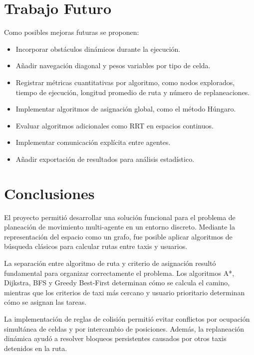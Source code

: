 \documentclass[12pt,a4paper]{article}
\begin{document}
\section{Trabajo Futuro}
\justifying

Como posibles mejoras futuras se proponen:

\begin{itemize}
    \item Incorporar obstáculos dinámicos durante la ejecución.
    \item Añadir navegación diagonal y pesos variables por tipo de celda.
    \item Registrar métricas cuantitativas por algoritmo, como nodos explorados, tiempo de ejecución, longitud promedio de ruta y número de replaneaciones.
    \item Implementar algoritmos de asignación global, como el método Húngaro.
    \item Evaluar algoritmos adicionales como RRT en espacios continuos.
    \item Implementar comunicación explícita entre agentes.
    \item Añadir exportación de resultados para análisis estadístico.
\end{itemize}

\section{Conclusiones}
\justifying

El proyecto permitió desarrollar una solución funcional para el problema de planeación de movimiento multi-agente en un entorno discreto. Mediante la representación del espacio como un grafo, fue posible aplicar algoritmos de búsqueda clásicos para calcular rutas entre taxis y usuarios.

La separación entre algoritmo de ruta y criterio de asignación resultó fundamental para organizar correctamente el problema. Los algoritmos A*, Dijkstra, BFS y Greedy Best-First determinan cómo se calcula el camino, mientras que los criterios de taxi más cercano y usuario prioritario determinan cómo se asignan las tareas.

La implementación de reglas de colisión permitió evitar conflictos por ocupación simultánea de celdas y por intercambio de posiciones. Además, la replaneación dinámica ayudó a resolver bloqueos persistentes causados por otros taxis detenidos en la ruta.
\end{document}
